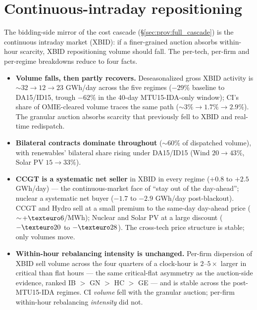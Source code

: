 \documentclass[11pt,a4paper]{article}
\begin{document}
\section{Continuous-intraday repositioning}\label{sec:prov:ci_per_tech}

\noindent The bidding-side mirror of the cost cascade (\S\ref{sec:prov:full_cascade}) is the continuous intraday market (XBID): if a finer-grained auction absorbs within-hour scarcity, XBID repositioning volume should fall. The per-tech, per-firm and per-regime breakdowns reduce to four facts.

\begin{itemize}\setlength{\itemsep}{3pt}
\item \textbf{Volume falls, then partly recovers.} Deseasonalized gross XBID activity is $\sim 32 \to 12 \to 23$ GWh/day across the five regimes ($-29\%$ baseline to DA15/ID15, trough $-62\%$ in the 40-day MTU15-IDA-only window); CI's share of OMIE-cleared volume traces the same path ($\sim 3\% \to 1.7\% \to 2.9\%$). The granular auction absorbs scarcity that previously fell to XBID and real-time redispatch.
\item \textbf{Bilateral contracts dominate throughout} ($\sim 60\%$ of dispatched volume), with renewables' bilateral share rising under DA15/ID15 (Wind $20\to43\%$, Solar PV $15\to33\%$).
\item \textbf{CCGT is a systematic net seller} in XBID in every regime ($+0.8$ to $+2.5$ GWh/day) --- the continuous-market face of ``stay out of the day-ahead''; nuclear a systematic net buyer ($-1.7$ to $-2.9$ GWh/day post-blackout). CCGT and Hydro sell at a small premium to the same-day day-ahead price ($\sim\!+\texteuro 6$/MWh); Nuclear and Solar PV at a large discount ($-\texteuro 20$ to $-\texteuro 28$). The cross-tech price structure is stable; only volumes move.
\item \textbf{Within-hour rebalancing intensity is unchanged.} Per-firm dispersion of XBID sell volume across the four quarters of a clock-hour is $2$--$5\times$ larger in critical than flat hours --- the same critical-flat asymmetry as the auction-side evidence, ranked IB $>$ GN $>$ HC $>$ GE --- and is stable across the post-MTU15-IDA regimes. CI \emph{volume} fell with the granular auction; per-firm within-hour rebalancing \emph{intensity} did not.
\end{itemize}
\end{document}
